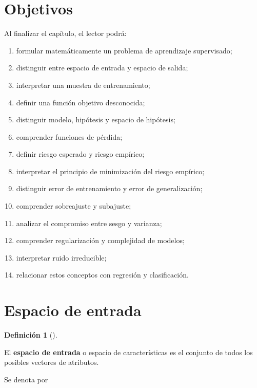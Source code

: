 \documentclass[
  spanish,
  11pt,
  letterpaper,
  DIV=11,
  numbers=noendperiod]{scrreprt}
\providecommand{\tightlist}{%
  \setlength{\itemsep}{0pt}\setlength{\parskip}{0pt}}
\theoremstyle{definition}
\newtheorem{definition}{Definición}[chapter]
\theoremstyle{plain}
\theoremstyle{definition}
\theoremstyle{remark}
\begin{document}
\section{Objetivos}\label{objetivos-4}

Al finalizar el capítulo, el lector podrá:

\begin{enumerate}
\def\labelenumi{\arabic{enumi}.}
\tightlist
\item
  formular matemáticamente un problema de aprendizaje supervisado;
\item
  distinguir entre espacio de entrada y espacio de salida;
\item
  interpretar una muestra de entrenamiento;
\item
  definir una función objetivo desconocida;
\item
  distinguir modelo, hipótesis y espacio de hipótesis;
\item
  comprender funciones de pérdida;
\item
  definir riesgo esperado y riesgo empírico;
\item
  interpretar el principio de minimización del riesgo empírico;
\item
  distinguir error de entrenamiento y error de generalización;
\item
  comprender sobreajuste y subajuste;
\item
  analizar el compromiso entre sesgo y varianza;
\item
  comprender regularización y complejidad de modelos;
\item
  interpretar ruido irreducible;
\item
  relacionar estos conceptos con regresión y clasificación.
\end{enumerate}

\section{Espacio de entrada}\label{espacio-de-entrada}

\begin{definition}[]\protect\hypertarget{def-espacio-entrada}{}\label{def-espacio-entrada}

El \textbf{espacio de entrada} o espacio de características es el
conjunto de todos los posibles vectores de atributos.

\end{definition}

Se denota por
\end{document}
